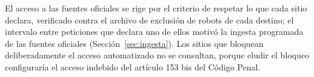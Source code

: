 El acceso a las fuentes oficiales se rige por el criterio de respetar lo que cada sitio declara, verificado contra el archivo de exclusión de robots de cada destino; el intervalo entre peticiones que declara uno de ellos motivó la ingesta programada de las fuentes oficiales (Sección~\ref{sec:ingesta}). Los sitios que bloquean deliberadamente el acceso automatizado no se consultan, porque eludir el bloqueo configuraría el acceso indebido del artículo 153 bis del Código Penal.